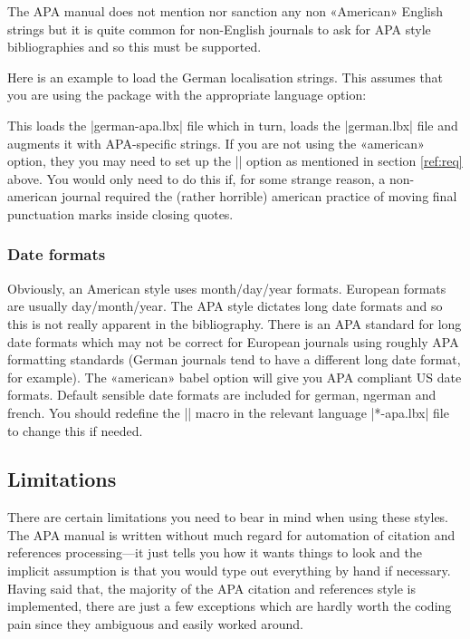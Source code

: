 \documentclass{ltxdockit}
\begin{document}
The APA manual does not mention nor sanction any non «American» English
strings but it is quite common for non-English journals to ask for APA style
bibliographies and so this must be supported.

Here is an example to load the German localisation strings. This assumes
that you are using the  package with the appropriate language
option:

\begin{ltxcode}
\end{ltxcode}

This loads the |german-apa.lbx| file which in turn, loads the |german.lbx|
file and augments it with APA-specific strings. If you are not using the
 «american» option, they you may need to set up the
|\DeclareQuotePunctuation| option as mentioned in section \ref{ref:req} above.
You would only need to do this if, for some strange reason, a non-american
journal required the (rather horrible) american practice of moving final
punctuation marks inside closing quotes.

\subsubsection{Date formats}

Obviously, an American style uses month/day/year formats. European formats
are usually day/month/year. The APA style dictates long date formats and so
this is not really apparent in the bibliography. There is an APA standard
for long date formats which may not be correct for European journals using
roughly APA formatting standards (German journals tend to have a different
long date format, for example). The «american» babel option will give you
APA compliant US date formats. Default sensible date formats are included
for german, ngerman and french. You should redefine the |\mkbibdatelong|
macro in the relevant language |*-apa.lbx| file to change this if needed.

\subsection{Limitations}
\label{use:limit}
There are certain limitations you need to bear in mind when using these
styles. The APA manual is written without much regard for automation of
citation and references processing---it just tells you how it wants things to
look and the implicit assumption is that you would type out everything by
hand if necessary. Having said that, the majority of the APA citation
and references style is implemented, there are just a few exceptions which
are hardly worth the coding pain since they ambiguous and easily worked
around.
\end{document}
